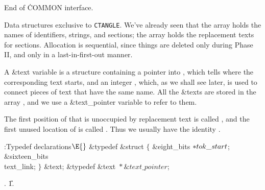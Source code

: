 End of \.{COMMON} interface.

\fi

Data structures exclusive to {\tt CTANGLE}.
We've already seen that the  array holds the names of
identifiers,
strings, and sections;
the  array holds the replacement texts
for sections. Allocation is sequential, since things are deleted only
during Phase II, and only in a last-in-first-out manner.

A \&{text} variable is a structure containing a pointer into
, which tells where the corresponding text starts, and an
integer , which, as we shall see later, is used to connect
pieces of text that have the same name.  All the \&{text}s are stored in
the array , and we use a \&{text\_pointer} variable to refer
to them.

The first position of  that is unoccupied by
replacement text is called , and the first unused location of
 is called .  Thus we usually have the
identity
.

\Y\B\4:Typedef declarations\X${}\E{}$\6
\&{typedef} \&{struct} ${}\{{}$\1\6
\&{eight\_bits} ${}{*}\\{tok\_start}{}$;\6
\&{sixteen\_bits} \\{text\_link};\2\6
${}\}{}$ \&{text};\6
\&{typedef} \&{text} ${}{*}\&{text\_pointer}{}$;\par
{}.
\U1.\fi


